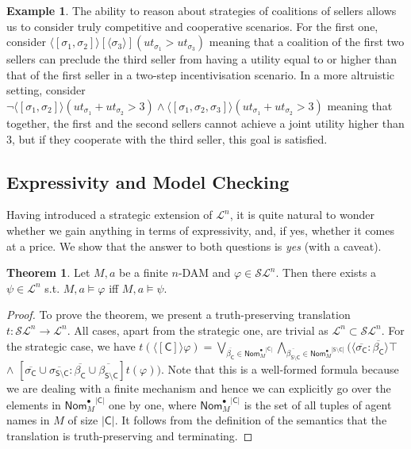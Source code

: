\documentclass[letterpaper]{article} %
\theoremstyle{definition}
\newtheorem{theorem}{Theorem}
\newtheorem{example}{Example}
\newcommand{\Nfin}{N^{\mathit{fin}}}
\begin{document}
\begin{example}
    The ability to reason about strategies of coalitions of sellers allows us to consider truly competitive and cooperative scenarios. For the first one, consider $\langle \! [\sigma_1,\sigma_2] \! \rangle [ \! \langle\sigma_3\rangle \! ] (ut_{\sigma_1} > ut_{\sigma_3})$ meaning that a coalition of the first two sellers %
    can preclude the third seller from having a utility equal to or higher than that of the first seller in a two-step incentivisation scenario. In a more altruistic setting, consider $\lnot \langle \! [\sigma_1,\sigma_2] \! \rangle (ut_{\sigma_1} + ut_{\sigma_2}>3) \land   \langle \! [\sigma_1,\sigma_2,\sigma_3] \! \rangle (ut_{\sigma_1} + ut_{\sigma_2}>3)$ meaning that together, the first and the second sellers cannot achieve a joint utility higher than 3, but if they cooperate with the third seller, this goal is satisfied.
\end{example}

\subsection{Expressivity and Model Checking}

Having introduced a strategic extension of $\mathcal{L}^n$, it is quite natural to wonder whether we gain anything in terms of expressivity, and, if yes, whether it comes at a price. We show that the answer to both questions is \textit{yes} (with a caveat). 

\begin{theorem}
\label{thm:truthpreserve}
Let $M,a$ be a finite $n$-DAM and $\varphi \in \mathcal{SL}^n$. Then there exists a $\psi \in \mathcal{L}^n$ s.t. $M,a \models \varphi$ iff $M,a \models \psi$.
\end{theorem}

\begin{proof}
    To prove the theorem, we present a truth-preserving translation $t:\mathcal{SL}^n \to \mathcal{L}^n$. All cases, apart from the strategic one, are trivial as $\mathcal{L}^n \subset \mathcal{SL}^n$. For the strategic case, we have $t(\langle \! [\mathsf{C}] \! \rangle \varphi) = \bigvee_{\overline{\beta_\mathsf{C}} \in {\mathsf{Nom}^\bullet_M}^{|\mathsf{C}|}} \bigwedge_{\overline{\beta_{\mathsf{S \setminus C}}} \in {\mathsf{Nom}^\bullet_M}^{|\mathsf{S \setminus C}|}} (\langle \overline{\sigma_{\mathsf{C}}}: \overline{\beta_{\mathsf{C}}} \rangle \top$ $\land$ 
$[{\overline{\sigma_\mathsf{C}}\cup \overline{\sigma_{\mathsf{S \setminus C}}}:\overline{\beta_\mathsf{C}}\cup \overline{\beta_{\mathsf{S \setminus C}}}} ] t(\varphi))$. Note that this is a well-formed formula because we are dealing with a finite mechanism and hence we can explicitly go over the elements in %
${\mathsf{Nom}^\bullet_M}^{|\mathsf{C}|}$ one by one, where %
${\mathsf{Nom}^\bullet_M}^{|\mathsf{C}|}$ is the set of all tuples of agent names in $M$ of size $|\mathsf{C}|$. It follows from the definition of the semantics that the translation is truth-preserving and terminating.
\end{proof}
\end{document}
